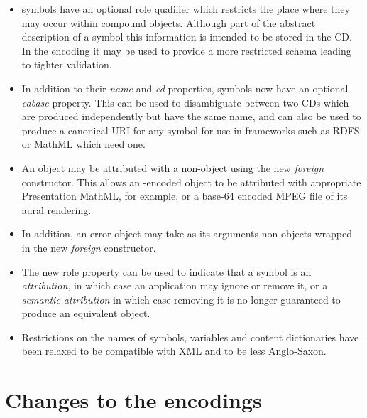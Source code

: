 \begin{appendix}
\begin{itemize}
\item \OM symbols have an optional role qualifier which restricts the place where they may
  occur within compound objects.  Although part of the abstract description of a symbol
  this information is intended to be stored in the CD.  In the \XML encoding it may be
  used to provide a more restricted schema leading to tighter validation.
\item In addition to their \emph{name} and \emph{cd} properties, symbols now have an
  optional \emph{cdbase} property.  This can be used to disambiguate between two CDs which
  are produced independently but have the same name, and can also be used to produce a
  canonical URI for any \OM symbol for use in frameworks such as RDFS or MathML which need
  one.
\item An \OM object may be attributed with a non-\OM object using the new \emph{foreign}
  constructor.  This allows an \XML-encoded \OM object to be attributed with appropriate
  Presentation MathML, for example, or a base-64 encoded MPEG file of its aural rendering.
\item In addition, an \OM error object may take as its arguments non-\OM objects wrapped
  in the new \emph{foreign} constructor.
\item The new role property can be used to indicate that a symbol is an
  \emph{attribution}, in which case an application may ignore or remove it, or a
  \emph{semantic attribution} in which case removing it is no longer
  guaranteed to produce an equivalent object.
\item Restrictions on the names of symbols, variables and content dictionaries have been
  relaxed to be compatible with XML and to be less Anglo-Saxon.
\end{itemize}
  
\section{Changes to the encodings}\label{chgenc}
    

\end{appendix}
